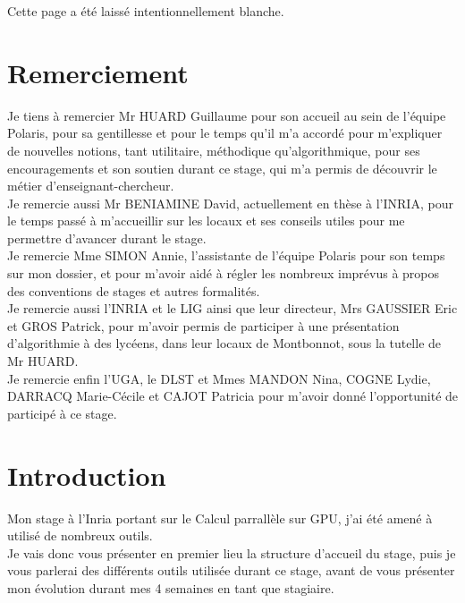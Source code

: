 \documentclass[a4paper,12pt]{article}
\begin{document}
	\newpage
	{\scriptsize Cette page a \'e{}t\'e{} laiss\'e{} intentionnellement blanche.
	\newpage
	\renewcommand{\contentsname}{
		\begin{center}
			Sommaire
		\end{center}
	}
	\setcounter{tocdepth}{3}
	\tableofcontents
	\newpage
	\section{Remerciement}
		\indent Je tiens à remercier Mr HUARD Guillaume pour son accueil au sein de l'équipe Polaris, pour sa gentillesse et pour le temps qu'il m'a accord\'e{} pour m'expliquer de nouvelles notions, tant utilitaire, m\'e{}thodique qu'algorithmique, pour ses encouragements et son soutien durant ce stage, qui m'a permis de d\'e{}couvrir le m\'e{}tier d'enseignant-chercheur. \\
		\indent Je remercie aussi Mr BENIAMINE David, actuellement en th\`ese à l'INRIA, pour le temps pass\'e{} à m’accueillir sur les locaux et ses conseils utiles pour me permettre d'avancer durant le stage.\\
		\indent Je remercie Mme SIMON Annie, l'assistante de l'\'e{}quipe Polaris pour son temps sur mon dossier, et pour m'avoir aid\'e{} à r\'e{}gler les nombreux impr\'e{}vus à propos des conventions de stages et autres formalit\'e{}s.\\
		\indent Je remercie aussi l'INRIA et le LIG ainsi que leur directeur, Mrs GAUSSIER Eric et GROS Patrick, pour m'avoir permis de participer à une pr\'e{}sentation d'algorithmie à des lycéens, dans leur locaux de Montbonnot, sous la tutelle de Mr HUARD.\\
		\indent Je remercie enfin l'UGA, le DLST et Mmes MANDON Nina, COGNE Lydie, DARRACQ Marie-Cécile et CAJOT Patricia pour m'avoir donné l'opportunité de participé à ce stage.
	\newpage
	\section{Introduction}
	\indent Mon stage à l'Inria portant sur le Calcul parrallèle sur GPU, j'ai été amené à utilisé de nombreux outils.\\
	\noindent Je vais donc vous présenter en premier lieu la structure d'accueil du stage, puis je vous parlerai des différents outils utilisée durant ce stage, avant de vous présenter mon évolution durant mes 4 semaines en tant que stagiaire.
}
\end{document}
